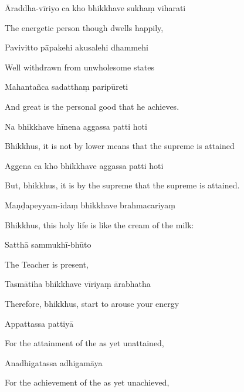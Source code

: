 Āraddha-vīriyo ca kho bhikkhave sukhaṃ viharati

\begin{english}
  The energetic person though dwells happily,
\end{english}

Pavivitto pāpakehi akusalehi dhammehi

\begin{english}
  Well withdrawn from unwholesome states
\end{english}

Mahantañca sadatthaṃ paripūreti

\begin{english}
  And great is the personal good that he achieves.
\end{english}

Na bhikkhave hīnena aggassa patti hoti

\begin{english}
  Bhikkhus, it is not by lower means that the supreme is attained
\end{english}

Aggena ca kho bhikkhave aggassa patti hoti

\begin{english}
  But, bhikkhus, it is by the supreme that the supreme is attained.
\end{english}

Maṇḍapeyyam-idaṃ bhikkhave brahmacariyaṃ

\begin{english}
  Bhikkhus, this holy life is like the cream of the milk:
\end{english}

Satthā sammukhī-bhūto

\begin{english}
  The Teacher is present,
\end{english}

Tasmātiha bhikkhave vīriyaṃ ārabhatha

\begin{english}
  Therefore, bhikkhus, start to arouse your energy
\end{english}

Appattassa pattiyā

\begin{english}
  For the attainment of the as yet unattained,
\end{english}

Anadhigatassa adhigamāya

\begin{english}
  For the achievement of the as yet unachieved,
\end{english}

